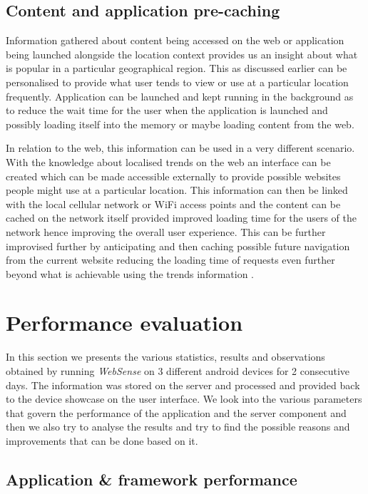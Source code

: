 \documentclass[12pt]{report}
\begin{document}
\section{Content and application pre-caching}

Information gathered about content being accessed on the web or application being launched alongside the location context provides us an insight about what is popular in a particular geographical region. This as discussed earlier can be personalised to provide what user tends to view or use at a particular location frequently. Application can be launched and kept running in the background as to reduce the wait time for the user when the application is launched and possibly loading itself into the memory or maybe loading content from the web.


In relation to the web, this information can be used in a very different scenario. With the knowledge about localised trends on the web an interface can be created which can be made accessible externally to provide possible websites people might use at a particular location. This information can then be linked with the local cellular network or WiFi access points and the content can be cached on the network itself provided improved loading time for the users of the network hence improving the overall user experience. This can be further improvised further by anticipating and then caching possible future navigation from the current website reducing the loading time of requests even further beyond what is achievable using the trends information \cite{cheluvaraju2011anticipatory}.

\chapter{Performance evaluation}
\label{PeformanceEval}

In this section we presents the various statistics, results and observations obtained by running \textit{WebSense} on 3 different android devices for 2 consecutive days. The information was stored on the server and processed and provided back to the device showcase on the user interface. We look into the various parameters that govern the performance of the application and the server component and then we also try to analyse the results and try to find the possible reasons and improvements that can be done based on it.


\section{Application \& framework performance}
\end{document}
